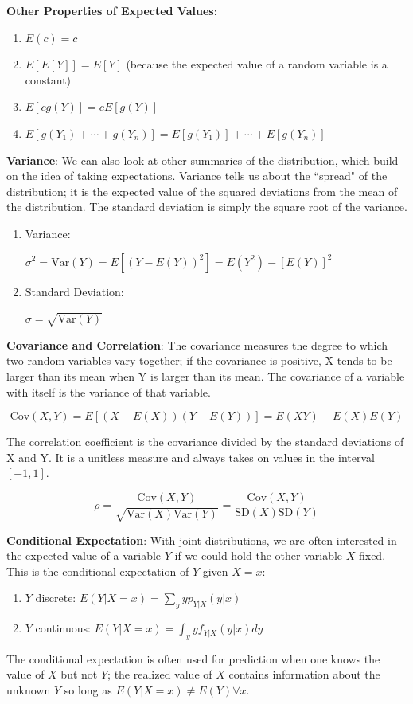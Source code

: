 \documentclass[20pt]{extarticle}
\newcommand{\be}{\begin{enumerate}}
\newcommand{\ee}{\end{enumerate}}
\newcommand{\pbof}{\parbox[t]{1.5in}}
\newcommand{\Var}{\mathrm{Var}}
\newcommand{\SD}{\mathrm{SD}}
\newcommand{\Cov}{\mathrm{Cov}}
\begin{document}
\item {\bf Other Properties of Expected Values}:
  \be
  \item $E(c)=c$
  \item $E[E[Y]] = E[Y]$ (because the expected value of a random variable is a constant)
  \item $E[c g(Y)]= c E[g(Y)]$
  \item $E[g(Y_1) + \cdots + g(Y_n)]=E[g(Y_1)]+\cdots+E[g(Y_n)]$
  \ee

\item {\bf Variance}:  We can also look at other summaries of the
distribution, which build on the idea of taking expectations.
Variance tells us about the ``spread" of the distribution; it is the
expected value of the squared deviations from the mean of the
distribution.  The standard deviation is simply the square root of the
variance.
  \be
  \item \pbof{Variance:} $\sigma^2= \Var(Y) = E[(Y - E(Y))^2] =  E(Y^2)-[E(Y)]^2$
  \item \pbof{Standard Deviation:} $\sigma= \sqrt{\Var(Y)}$
  \ee

\item {\bf Covariance and Correlation}: The covariance measures the
  degree to which two random variables vary together; if the
  covariance is positive, X tends to be larger than its mean when Y is
  larger than its mean.  The covariance of a variable with itself is
  the variance of that variable.

$$\Cov(X,Y) = E[(X - E(X))(Y - E(Y))] = E(XY) - E(X)E(Y)$$

The correlation coefficient is the covariance divided by the standard
deviations of X and Y.  It is a unitless measure and always takes on
values in the interval $[-1,1]$.

$$\rho = \frac{\Cov(X,Y)}{\sqrt{\Var(X)\Var(Y)}} = \frac{\Cov(X,Y)}{\SD(X)\SD(Y)}$$


\item {\bf Conditional Expectation}: With joint distributions, we are
  often interested in the expected value of a variable $Y$ if we could
  hold the other variable $X$ fixed.  This is the conditional
  expectation of $Y$ given $X = x$: \be
\item $Y$ discrete:  $E(Y|X = x) = \sum_y yp_{Y|X}(y|x)$
\item $Y$ continuous: $E(Y|X = x) = \int_y yf_{Y|X}(y|x)dy$ \ee The
  conditional expectation is often used for prediction when one knows
  the value of $X$ but not $Y$; the realized value of $X$ contains
  information about the unknown $Y$ so long as $E(Y|X = x) \neq E(Y)
  \forall x$.
\end{document}
